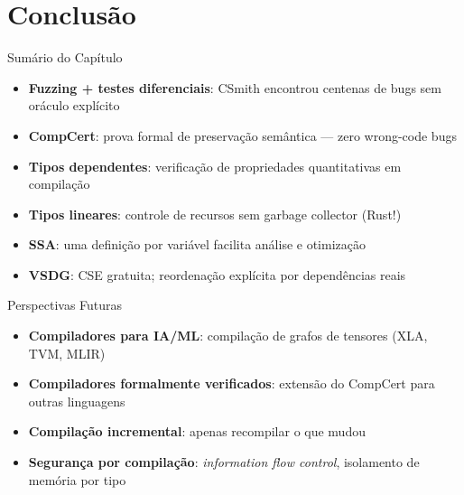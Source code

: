 \section{Conclusão}\label{conclusuxe3o}

\begin{frame}{Sumário do Capítulo}

    \begin{itemize}

        \item
        \textbf{Fuzzing + testes diferenciais}: CSmith encontrou centenas de
        bugs sem oráculo explícito
        \item
        \textbf{CompCert}: prova formal de preservação semântica --- zero
        wrong-code bugs
        \item
        \textbf{Tipos dependentes}: verificação de propriedades quantitativas
        em compilação
        \item
        \textbf{Tipos lineares}: controle de recursos sem garbage collector
        (Rust!)
        \item
        \textbf{SSA}: uma definição por variável facilita análise e otimização
        \item
        \textbf{VSDG}: CSE gratuita; reordenação explícita por dependências
        reais
    \end{itemize}
\end{frame}

\begin{frame}{Perspectivas Futuras}

    \begin{itemize}

        \item
        \textbf{Compiladores para IA/ML}: compilação de grafos de tensores
        (XLA, TVM, MLIR)
        \item
        \textbf{Compiladores formalmente verificados}: extensão do CompCert
        para outras linguagens
        \item
        \textbf{Compilação incremental}: apenas recompilar o que mudou
        \item
        \textbf{Segurança por compilação}: \emph{information flow control},
        isolamento de memória por tipo
    \end{itemize}
\end{frame}
